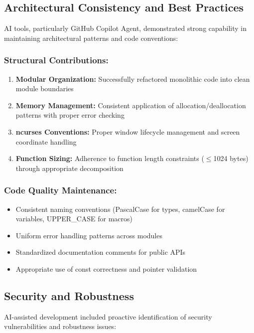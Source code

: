 \documentclass[12pt,a4paper]{article}
\begin{document}
\subsection{Architectural Consistency and Best Practices}

AI tools, particularly GitHub Copilot Agent, demonstrated strong capability in maintaining architectural patterns and code conventions:

\subsubsection*{Structural Contributions:}
\begin{enumerate}
    \item \textbf{Modular Organization:} Successfully refactored monolithic code into clean module boundaries
    \item \textbf{Memory Management:} Consistent application of allocation/deallocation patterns with proper error checking
    \item \textbf{ncurses Conventions:} Proper window lifecycle management and screen coordinate handling
    \item \textbf{Function Sizing:} Adherence to function length constraints ($\leq$1024 bytes) through appropriate decomposition
\end{enumerate}

\subsubsection*{Code Quality Maintenance:}
\begin{itemize}
    \item Consistent naming conventions (PascalCase for types, camelCase for variables, UPPER\_CASE for macros)
    \item Uniform error handling patterns across modules
    \item Standardized documentation comments for public APIs
    \item Appropriate use of const correctness and pointer validation
\end{itemize}

\subsection{Security and Robustness}

AI-assisted development included proactive identification of security vulnerabilities and robustness issues:
\end{document}
